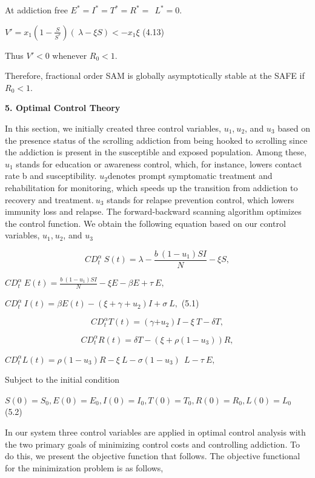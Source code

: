 \documentclass[10pt]{NSP1}
\begin{document}
At addiction free \(E^{*} = I^{*} = T^{*} = R^{*} = \ \ L^{*} = 0\).

\(V' = x_{1}\left( 1 - \frac{S}{S^{*}} \right)(\ \lambda - \xi S) < - x_{1}\xi\) (4.13)

Thus \(V' < 0\) whenever \(R_{0} < 1\).

Therefore, fractional order SAM is globally asymptotically stable at the SAFE if \(R_{0} < 1.\)

\par\medskip\noindent \begin{center}\normalsize\bfseries 5. Optimal Control Theory\end{center}\smallskip

In this section, we initially created three control variables, \(u_{1}\),\(\ u_{2}\), and \(u_{3}\) based on the presence status of the scrolling addiction from being hooked to scrolling since the addiction is present in the susceptible and exposed population. Among these, \(u_{1}\) stands for education or awareness control, which, for instance, lowers contact rate b and susceptibility. \(u_{2}\)denotes prompt symptomatic treatment and rehabilitation for monitoring, which speeds up the transition from addiction to recovery and treatment.\(\ u_{3}\) stands for relapse prevention control, which lowers immunity loss and relapse. The forward-backward scanning algorithm optimizes the control function. We obtain the following equation based on our control variables, \(u_{1}\),\(\ u_{2}\), and \(u_{3}\)

\[
CD_{t}^{\alpha}\ S(t) = \lambda - \frac{b\ (1 - u_{1})SI}{N} - \xi S,
\]

\(CD_{t}^{\alpha}\ E(t) = \frac{b\ (1 - u_{1})SI}{N} - \xi E - \beta E + \tau\ E,\)

\(CD_{t}^{\alpha}\ I(t) = \beta E(t) - (\xi + \gamma + u_{2})I + \sigma\ L,\) (5.1)

\[
CD_{t}^{\alpha}T(t) = (\gamma{+ u}_{2})I - \xi\ T - \delta T,
\]

\[
CD_{t}^{\alpha}R(t) = \delta T - (\xi + \rho\left( 1 - u_{3} \right))R,
\]

\(CD_{t}^{\alpha}L(t) = \rho\left( 1 - u_{3} \right)R - \xi\ L - \sigma(1 - u_{3})\ \ L - \tau\ E,\)

Subject to the initial condition

\(S(0) = S_{0},E(0) = E_{0},I(0) = I_{0},T(0) = T_{0},R(0) = R_{0},L(0) = L_{0}\) (5.2)

In our system three control variables are applied in optimal control analysis with the two primary goals of minimizing control costs and controlling addiction. To do this, we present the objective function that follows. The objective functional for the minimization problem is as follows,
\end{document}
